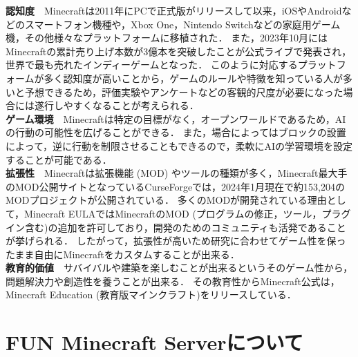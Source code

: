 \textbf{認知度}　Minecraftは2011年にPCで正式版がリリースして以来，iOSやAndroidなどのスマートフォン機種や，Xbox One，Nintendo Switchなどの家庭用ゲーム機，その他様々なプラットフォームに移植された．
また，2023年10月にはMinecraftの累計売り上げ本数が3億本を突破したことが公式ライブで発表され，世界で最も売れたインディーゲームとなった\cite{bib:minecraft_news}．
このように対応するプラットフォームが多く認知度が高いことから，ゲームのルールや特徴を知っている人が多いと予想できるため，評価実験やアンケートなどの客観的尺度が必要になった場合には遂行しやすくなることが考えられる．\\

\textbf{ゲーム環境}　Minecraftは特定の目標がなく，オープンワールドであるため，AIの行動の可能性を広げることができる．
また，場合によってはブロックの設置によって，逆に行動を制限させることもできるので，柔軟にAIの学習環境を設定することが可能である．\\

\textbf{拡張性}　Minecraftは拡張機能 (MOD) やツールの種類が多く，Minecraft最大手のMOD公開サイトとなっているCurseForgeでは，2024年1月現在で約153,204のMODプロジェクトが公開されている．
多くのMODが開発されている理由として，Minecraft EULAではMinecraftのMOD (プログラムの修正，ツール，プラグイン含む)の追加を許可しており，開発のためのコミュニティも活発であることが挙げられる．
したがって，拡張性が高いため研究に合わせてゲーム性を保ったまま自由にMinecraftをカスタムすることが出来る．\\

\textbf{教育的価値}　サバイバルや建築を楽しむことが出来るというそのゲーム性から，問題解決力や創造性を養うことが出来る．
その教育性からMinecraft公式は，Minecraft Education (教育版マインクラフト)をリリースしている． \\

\section{FUN Minecraft Serverについて}

